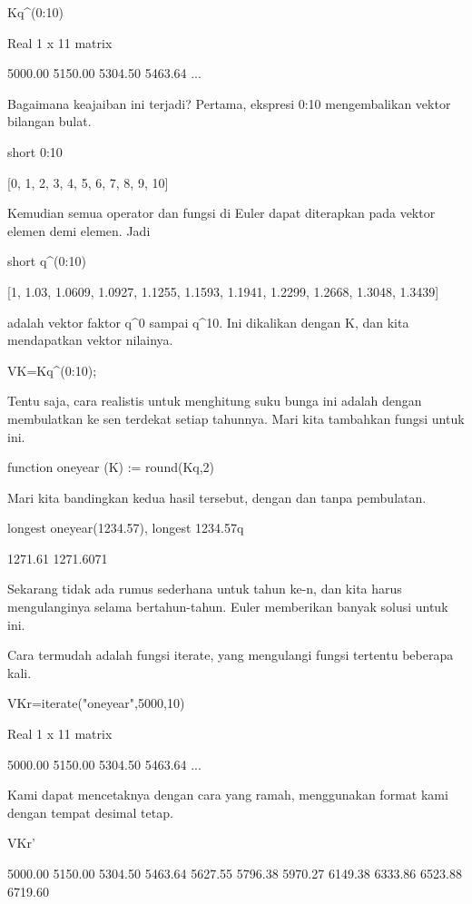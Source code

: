 \documentclass{article}
\begin{document}
\>K\*q^(0:10)


    Real 1 x 11 matrix
    
        5000.00     5150.00     5304.50     5463.64     ...

Bagaimana keajaiban ini terjadi? Pertama, ekspresi 0:10 mengembalikan
vektor bilangan bulat.


\>short 0:10


    [0,  1,  2,  3,  4,  5,  6,  7,  8,  9,  10]

Kemudian semua operator dan fungsi di Euler dapat diterapkan pada
vektor elemen demi elemen. Jadi


\>short q^(0:10)


    [1,  1.03,  1.0609,  1.0927,  1.1255,  1.1593,  1.1941,  1.2299,
    1.2668,  1.3048,  1.3439]

adalah vektor faktor q^0 sampai q^10. Ini dikalikan dengan K, dan kita
mendapatkan vektor nilainya.


\>VK=K\*q^(0:10);


Tentu saja, cara realistis untuk menghitung suku bunga ini adalah
dengan membulatkan ke sen terdekat setiap tahunnya. Mari kita
tambahkan fungsi untuk ini.


\>function oneyear (K) := round(K\*q,2)


Mari kita bandingkan kedua hasil tersebut, dengan dan tanpa
pembulatan.


\>longest oneyear(1234.57), longest 1234.57\*q


                    1271.61 
                  1271.6071 

Sekarang tidak ada rumus sederhana untuk tahun ke-n, dan kita harus
mengulanginya selama bertahun-tahun. Euler memberikan banyak solusi
untuk ini.


Cara termudah adalah fungsi iterate, yang mengulangi fungsi tertentu
beberapa kali.


\>VKr=iterate("oneyear",5000,10)


    Real 1 x 11 matrix
    
        5000.00     5150.00     5304.50     5463.64     ...

Kami dapat mencetaknya dengan cara yang ramah, menggunakan format kami
dengan tempat desimal tetap.


\>VKr'


        5000.00 
        5150.00 
        5304.50 
        5463.64 
        5627.55 
        5796.38 
        5970.27 
        6149.38 
        6333.86 
        6523.88 
        6719.60 
\end{document}
